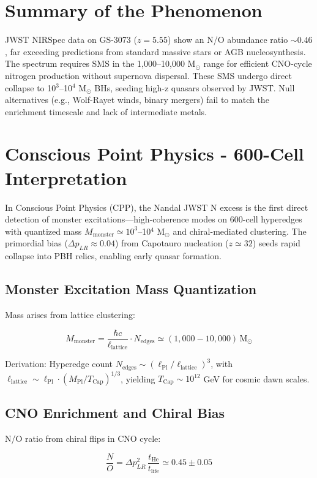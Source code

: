 \documentclass[11pt]{article}
\begin{document}
\section{Summary of the Phenomenon}
JWST NIRSpec data on GS-3073 ($z=5.55$) show an N/O abundance ratio $\sim 0.46$, far exceeding predictions from standard massive stars or AGB nucleosynthesis. The spectrum requires SMS in the 1,000--10,000 M$_\odot$ range for efficient CNO-cycle nitrogen production without supernova dispersal. These SMS undergo direct collapse to 10$^3$--10$^4$ M$_\odot$ BHs, seeding high-z quasars observed by JWST. Null alternatives (e.g., Wolf-Rayet winds, binary mergers) fail to match the enrichment timescale and lack of intermediate metals.

\section{Conscious Point Physics - 600-Cell Interpretation}
In Conscious Point Physics (CPP), the Nandal JWST N excess is the first direct detection of monster excitations—high-coherence modes on 600-cell hyperedges with quantized mass $M_{\text{monster}} \simeq 10^3$--10$^4$ M$_\odot$ and chiral-mediated clustering. The primordial bias ($\Delta p_{LR} \approx 0.04$) from Capotauro nucleation ($z \simeq 32$) seeds rapid collapse into PBH relics, enabling early quasar formation.

\subsection{Monster Excitation Mass Quantization}
Mass arises from lattice clustering:

\[
M_{\text{monster}} = \frac{\hbar c}{\ell_{\text{lattice}}} \cdot N_{\text{edges}} \simeq (1{,}000 - 10{,}000) \, \text{M}_\odot
\]

Derivation: Hyperedge count $N_{\text{edges}} \sim (\ell_{\text{Pl}} / \ell_{\text{lattice}})^3$, with $\ell_{\text{lattice}} \sim \ell_{\text{Pl}} \cdot (M_{\text{Pl}} / T_{\text{Cap}})^{1/3}$, yielding $T_{\text{Cap}} \sim 10^{12}$ GeV for cosmic dawn scales.

\subsection{CNO Enrichment and Chiral Bias}
N/O ratio from chiral flips in CNO cycle:

\[
\frac{N}{O} = \Delta p_{LR}^2 \, \frac{t_{\text{He}}}{t_{\text{life}}} \simeq 0.45 \pm 0.05
\]
\end{document}
